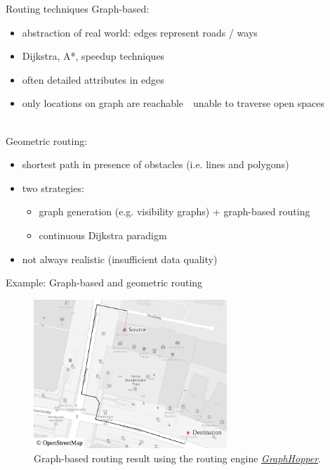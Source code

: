 \documentclass[xcolor={x11names}]{beamer}
\renewcommand{\n}{\hfill\\[0.5ex]}
\newcommand{\nn}{\hfill\\[2ex]}
\newenvironment{figcenter}
{%
	\parskip=0pt%
	\par%
	\nopagebreak%
	\centering%
}%
{%
	\par%
	\noindent%
	\ignorespacesafterend%
}
\begin{document}
		\begin{frame}{Routing techniques}
			Graph-based:\n
			\begin{itemize}
				\item abstraction of real world: edges represent roads / ways
				\item Dijkstra, A*, speedup techniques
				\item often detailed attributes in edges
				\pause
				\item only locations on graph are reachable\ \textrightarrow\ unable to traverse open spaces
			\end{itemize}
			\nn
			\pause
			Geometric routing:\n
			\begin{itemize}
				\item shortest path in presence of obstacles (i.e. lines and polygons)
				\item two strategies:
				\begin{itemize}
					\item graph generation (e.g. visibility graphs) + graph-based routing
					\item continuous Dijkstra paradigm
				\end{itemize}
				\pause
				\item not always realistic (insufficient data quality)
			\end{itemize}
		\end{frame}
	
		\begin{frame}{Example: Graph-based and geometric routing}
			\begin{figure}[t]
				\begin{figcenter}
					\includegraphics[width=0.65\textwidth]{images/qgis-routing-osterstrasse_routing.pdf}
				\end{figcenter}
				\caption{Graph-based routing result using the routing engine \href{https://www.osm.org/directions?engine=graphhopper\_foot\&route=53.57657,9.95210;53.57601,9.95268}{\emph{GraphHopper}}.}
			\end{figure}
		\end{frame}
	
\end{document}
